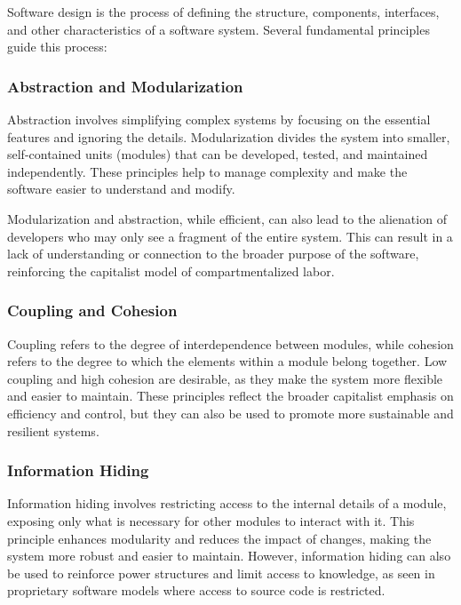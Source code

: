 \begin{refsection}
\begin{multicols}{2}
{Software design is the process of defining the structure, components, interfaces, and other characteristics of a software system. Several fundamental principles guide this process:

\subsubsection{Abstraction and Modularization}

Abstraction involves simplifying complex systems by focusing on the essential features and ignoring the details. Modularization divides the system into smaller, self-contained units (modules) that can be developed, tested, and maintained independently. These principles help to manage complexity and make the software easier to understand and modify.

Modularization and abstraction, while efficient, can also lead to the alienation of developers who may only see a fragment of the entire system. This can result in a lack of understanding or connection to the broader purpose of the software, reinforcing the capitalist model of compartmentalized labor.

\subsubsection{Coupling and Cohesion}

Coupling refers to the degree of interdependence between modules, while cohesion refers to the degree to which the elements within a module belong together. Low coupling and high cohesion are desirable, as they make the system more flexible and easier to maintain. These principles reflect the broader capitalist emphasis on efficiency and control, but they can also be used to promote more sustainable and resilient systems.

\subsubsection{Information Hiding}

Information hiding involves restricting access to the internal details of a module, exposing only what is necessary for other modules to interact with it. This principle enhances modularity and reduces the impact of changes, making the system more robust and easier to maintain. However, information hiding can also be used to reinforce power structures and limit access to knowledge, as seen in proprietary software models where access to source code is restricted.

}
\end{multicols}
\end{refsection}
